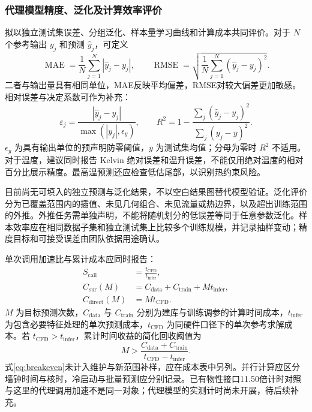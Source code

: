 \documentclass[UTF8]{midterm}
\begin{document}
\subsubsection{代理模型精度、泛化及计算效率评价}
拟以独立测试集误差、分组泛化、样本量学习曲线和计算成本共同评价。对于 $N$ 个参考输出 $y_j$ 和预测 $\widehat y_j$，可定义
\begin{equation}
\operatorname{MAE}=\frac1N\sum_{j=1}^N|\widehat y_j-y_j|,\qquad
\operatorname{RMSE}=\sqrt{\frac1N\sum_{j=1}^N(\widehat y_j-y_j)^2}.\label{eq:errors}
\end{equation}
二者与输出量具有相同单位，MAE反映平均偏差，RMSE对较大偏差更加敏感。相对误差与决定系数可作为补充：
\begin{equation}
\varepsilon_{j}=\frac{|\widehat y_j-y_j|}{\max(|y_j|,\epsilon_y)},\qquad
R^2=1-\frac{\sum_j(\widehat y_j-y_j)^2}{\sum_j(y_j-\overline y)^2}.\label{eq:relative}
\end{equation}
$\epsilon_y$ 为具有输出单位的预声明防零阈值，$\overline y$ 为测试集均值；分母为零时 $R^2$ 不适用。对于温度，建议同时报告 Kelvin 绝对误差和温升误差，不能仅用绝对温度的相对百分比展示精度。最高温预测还应检查低估尾部，以识别热约束风险。

目前尚无可填入的独立预测与泛化结果，不以空白结果图替代模型验证。泛化评价分为已覆盖范围内的插值、未见几何组合、未见流量或热边界，以及超出训练范围的外推。外推任务需单独声明，不能将随机划分的低误差等同于任意参数泛化。样本效率应在相同数据子集和独立测试集上比较多个训练规模，并记录抽样变动；精度目标和可接受误差由团队依据用途确认。

单次调用加速比与累计成本应同时报告：
\begin{equation}\begin{aligned}
S_{\mathrm{call}}&=\frac{t_{\mathrm{CFD}}}{t_{\mathrm{infer}}},\\
C_{\mathrm{sur}}(M)&=C_{\mathrm{data}}+C_{\mathrm{train}}+M t_{\mathrm{infer}},\\
C_{\mathrm{direct}}(M)&=M t_{\mathrm{CFD}}.
\end{aligned}\label{eq:cost}
\end{equation}
$M$ 为目标预测次数，$C_{\mathrm{data}}$ 与 $C_{\mathrm{train}}$ 分别为建库与训练调参的计算时间成本，$t_{\mathrm{infer}}$ 为包含必要特征处理的单次预测成本，$t_{\mathrm{CFD}}$ 为同硬件口径下的单次参考求解成本。若 $t_{\mathrm{CFD}}>t_{\mathrm{infer}}$，累计时间收益的简化回收阈值为
\begin{equation}
M>\frac{C_{\mathrm{data}}+C_{\mathrm{train}}}{t_{\mathrm{CFD}}-t_{\mathrm{infer}}}.\label{eq:breakeven}
\end{equation}
式\eqref{eq:breakeven}未计入维护与新范围补样，应在成本表中另列。并行计算应区分墙钟时间与核时，冷启动与批量预测应分别记录。已有物性接口11.50倍计时对照与这里的代理调用加速不是同一对象；代理模型的实测计时尚未开展，待后续补充。
\end{document}
